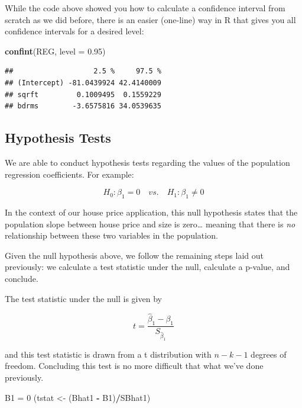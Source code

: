 \documentclass[
]{book}
\newenvironment{Shaded}{\begin{snugshade}}{\end{snugshade}}
\newcommand{\AttributeTok}[1]{\textcolor[rgb]{0.13,0.29,0.53}{#1}}
\newcommand{\DecValTok}[1]{\textcolor[rgb]{0.00,0.00,0.81}{#1}}
\newcommand{\FloatTok}[1]{\textcolor[rgb]{0.00,0.00,0.81}{#1}}
\newcommand{\FunctionTok}[1]{\textcolor[rgb]{0.13,0.29,0.53}{\textbf{#1}}}
\newcommand{\NormalTok}[1]{#1}
\newcommand{\OtherTok}[1]{\textcolor[rgb]{0.56,0.35,0.01}{#1}}
\newcommand{\SpecialCharTok}[1]{\textcolor[rgb]{0.81,0.36,0.00}{\textbf{#1}}}
\begin{document}
While the code above showed you how to calculate a confidence interval from scratch as we did before, there is an easier (one-line) way in R that gives you all confidence intervals for a desired level:

\begin{Shaded}
\begin{Highlighting}[]
\FunctionTok{confint}\NormalTok{(REG, }\AttributeTok{level =} \FloatTok{0.95}\NormalTok{)}
\end{Highlighting}
\end{Shaded}

\begin{verbatim}
##                   2.5 %     97.5 %
## (Intercept) -81.0439924 42.4140009
## sqrft         0.1009495  0.1559229
## bdrms        -3.6575816 34.0539635
\end{verbatim}

\subsection{Hypothesis Tests}\label{hypothesis-tests-1}

We are able to conduct hypothesis tests regarding the values of the population regression coefficients. For example:

\[H_0:\beta_1 = 0 \quad vs. \quad H_1:\beta_1 \neq 0\]

In the context of our house price application, this null hypothesis states that the population slope between house price and size is zero\ldots{} meaning that there is \emph{no} relationship between these two variables in the population.

Given the null hypothesis above, we follow the remaining steps laid out previously: we calculate a test statistic under the null, calculate a p-value, and conclude.

The test statistic under the null is given by

\[t=\frac{\hat{\beta}_1 - \beta_1}{S_{\hat{\beta}_1}}\]

and this test statistic is drawn from a t distribution with \(n-k-1\) degrees of freedom. Concluding this test is no more difficult that what we've done previously.

\begin{Shaded}
\begin{Highlighting}[]
\NormalTok{B1 }\OtherTok{=} \DecValTok{0}
\NormalTok{(tstat }\OtherTok{\textless{}{-}}\NormalTok{ (Bhat1 }\SpecialCharTok{{-}}\NormalTok{ B1)}\SpecialCharTok{/}\NormalTok{SBhat1)}
\end{Highlighting}
\end{Shaded}
\end{document}
